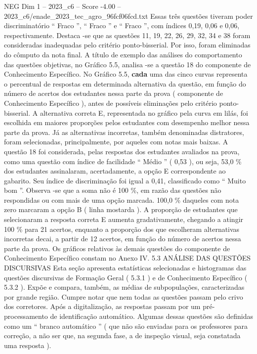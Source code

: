 \begin{textsample}{NEG Dim 1 – 2023\_c6 – Score -4.00 – 2023\_c6/enade\_2023\_tec\_agro\_96fcf06fcd.txt}
Essas três questões tiveram poder discriminatório “ Fraco ”, “ Fraco ” e “ Fraco ”, com índices 0,19, 0,06 e 0,06, respectivamente.
Destaca -se que as questões 11, 19, 22, 26, 29, 32, 34 e 38 foram consideradas inadequadas pelo critério ponto-bisserial.
Por isso, foram eliminadas do cômputo da nota final.
A título de exemplo das análises do comportamento das questões objetivas, no Gráfico 5.5, analisa -se a questão 18 do componente de Conhecimento Específico.
No Gráfico 5.5, \textbf{cada} uma das cinco curvas representa o percentual de respostas em determinada alternativa da questão, em função do número de acertos dos estudantes nessa parte da prova ( componente de Conhecimento Específico ), antes de possíveis eliminações pelo critério ponto-bisserial.
A alternativa correta E, representada no gráfico pela curva em lilás, foi escolhida em maiores proporções pelos estudantes com desempenho melhor nessa parte da prova.
Já as alternativas incorretas, também denominadas distratores, foram selecionadas, principalmente, por aqueles com notas mais baixas.
A questão 18 foi considerada, pelas respostas dos estudantes avaliados na prova, como uma questão com índice de facilidade “ Médio ” ( 0,53 ), ou seja, 53,0 \% dos estudantes assinalaram, acertadamente, a opção E correspondente ao gabarito.
Seu índice de discriminação foi igual a 0,41, classificado como “ Muito bom ”.
Observa -se que a soma não é 100 \%, em razão das questões não respondidas ou com mais de uma opção marcada. 100,0 \% daqueles com nota zero marcaram a opção B ( linha mostarda ).
A proporção de estudantes que selecionaram a resposta correta E aumenta gradativamente, chegando a atingir 100 \% para 21 acertos, enquanto a proporção dos que escolheram alternativas incorretas decai, a partir de 12 acertos, em função do número de acertos nessa parte da prova.
Os gráficos relativos às demais questões do componente de Conhecimento Específico constam no Anexo IV. 5.3 ANÁLISE DAS QUESTÕES DISCURSIVAS Esta seção apresenta estatísticas selecionadas e histogramas das questões discursivas de Formação Geral ( 5.3.1 ) e de Conhecimento Específico ( 5.3.2 ).
Expõe e compara, também, as médias de subpopulações, caracterizadas por grande região.
Cumpre notar que nem todas as questões passam pelo crivo dos corretores.
Após a digitalização, as respostas passam por um pré-processamento de identificação automático.
Algumas dessas questões são definidas como um “ branco automático ” ( que não são enviadas para os professores para correção, a não ser que, na segunda fase, a de inspeção visual, seja constatada uma resposta ).

\end{textsample}
